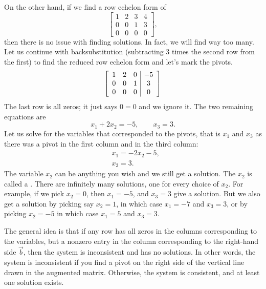 \documentclass{ximera}
\begin{document}
On the other hand, if we find a row echelon form of
\begin{equation*}
    \left[
        \begin{array}{ccc|c}
            1 & 2 & 3 & 4 \\
            0 & 0 & 1 & 3 \\
            0 & 0 & 0 & 0 
        \end{array}
    \right] ,
\end{equation*}
then there is no issue with finding solutions.  In fact, we will find way too many.  Let us continue with backsubstitution (subtracting 3 times the second row from the first) to find the reduced row echelon form and let's mark the pivots.
\begin{equation*}
    \left[
        \begin{array}{ccc|c}
            1 & 2 & 0 & -5 \\
            0 & 0 & 1 & 3 \\
            0 & 0 & 0 & 0 
        \end{array}
    \right]
\end{equation*}
The last row is all zeros; it just says $0=0$ and we ignore it. The two remaining equations are 
\begin{equation*}
    x_1 + 2 x_2 = -5 , \qquad
    x_3 = 3 .
\end{equation*}
Let us solve for the variables that corresponded to the pivots, that is $x_1$ and $x_3$ as there was a pivot in the first column and in the third column:
\begin{align*}
    & x_1 = - 2 x_2 -5 , \\
    & x_3 = 3 .
\end{align*}
The variable $x_2$ can be anything you wish and we still get a solution. The $x_2$ is called a \emph{}. There are infinitely many solutions, one for every choice of $x_2$. For example, if we pick $x_2=0$, then $x_1 = -5$, and $x_3 = 3$ give a solution.  But we also get a solution by picking say $x_2 = 1$, in which case $x_1 = -7$ and $x_3 = 3$, or by picking $x_2 = -5$ in which case $x_1 = 5$ and $x_3 = 3$.


The general idea is that if any row has all zeros in the columns corresponding to the variables, but a nonzero entry in the column corresponding to the right-hand side $\vec{b}$, then the system is inconsistent and has no solutions. In other words, the system is inconsistent if you find a pivot on the right side of the vertical line drawn in the augmented matrix.  Otherwise, the system is consistent, and at least one solution exists.
\end{document}
